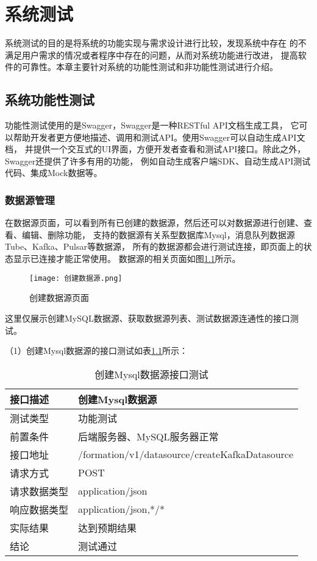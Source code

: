 
\chapter{系统测试}

系统测试的目的是将系统的功能实现与需求设计进行比较，发现系统中存在
的不满足用户需求的情况或者程序中存在的问题，从而对系统功能进行改进，
提高软件的可靠性。本章主要针对系统的功能性测试和非功能性测试进行介绍\cite{32}。

\section{系统功能性测试}

功能性测试使用的是Swagger，Swagger是一种RESTful API文档生成工具，
它可以帮助开发者更方便地描述、调用和测试API。使用Swagger可以自动生成API文档，
并提供一个交互式的UI界面，方便开发者查看和测试API接口。除此之外，Swagger还提供了许多有用的功能，
例如自动生成客户端SDK、自动生成API测试代码、集成Mock数据等。

\subsection{数据源管理}

在数据源页面，可以看到所有已创建的数据源，然后还可以对数据源进行创建、查看、编辑、删除功能，
支持的数据源有关系型数据库Mysql，消息队列数据源Tube、Kafka、Pulsar等数据源，
所有的数据源都会进行测试连接，即页面上的状态显示已连接才能正常使用。
数据源的相关页面如图\ref{fig:创建数据源页面}所示。

\begin{figure}[H]
  \centering
  \texttt{[image: 创建数据源.png]}
  \caption{创建数据源页面}
  \label{fig:创建数据源页面}
\end{figure}

这里仅展示创建MySQL数据源、获取数据源列表、测试数据源连通性的接口测试。

（1）创建Mysql数据源的接口测试如表\ref{tab:exampletable1}所示：

\begin{table}[H]
  \centering
  \caption{创建Mysql数据源接口测试}
  \label{tab:exampletable1}
  \begin{tabular}{ll}
    \toprule
    接口描述         & 创建Mysql数据源          \\
    \midrule
    测试类型         & 功能测试         \\
    前置条件         & 后端服务器、MySQL服务器正常         \\
    接口地址       & /formation/v1/datasource/createKafkaDatasource         \\
    请求方式         & POST      \\
    请求数据类型         & application/json     \\
    响应数据类型         & application/json,*/*           \\
    实际结果         & 达到预期结果           \\
    结论            & 测试通过           \\
    \bottomrule
  \end{tabular}
\end{table}

